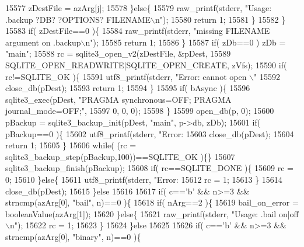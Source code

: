 \begin{DoxyCode}
{15577         zDestFile = azArg[j];
15578       \}\textcolor{keywordflow}{else}\{
15579         raw_printf(stderr, \textcolor{stringliteral}{"Usage: .backup ?DB? ?OPTIONS? FILENAME\(\backslash\)n"});
15580         \textcolor{keywordflow}{return} 1;
15581       \}
15582     \}
15583     \textcolor{keywordflow}{if}( zDestFile==0 )\{
15584       raw_printf(stderr, \textcolor{stringliteral}{"missing FILENAME argument on .backup\(\backslash\)n"});
15585       \textcolor{keywordflow}{return} 1;
15586     \}
15587     \textcolor{keywordflow}{if}( zDb==0 ) zDb = \textcolor{stringliteral}{"main"};
15588     rc = sqlite3_open_v2(zDestFile, &pDest, 
15589                   SQLITE_OPEN_READWRITE|SQLITE_OPEN_CREATE, zVfs);
15590     \textcolor{keywordflow}{if}( rc!=SQLITE_OK )\{
15591       utf8_printf(stderr, \textcolor{stringliteral}{"Error: cannot open \(\backslash\)"%
15592       close_db(pDest);
15593       \textcolor{keywordflow}{return} 1;
15594     \}
15595     \textcolor{keywordflow}{if}( bAsync )\{
15596       sqlite3_exec(pDest, \textcolor{stringliteral}{"PRAGMA synchronous=OFF; PRAGMA journal\_mode=OFF;"},
15597                    0, 0, 0);
15598     \}
15599     open_db(p, 0);
15600     pBackup = sqlite3_backup_init(pDest, \textcolor{stringliteral}{"main"}, p->db, zDb);
15601     \textcolor{keywordflow}{if}( pBackup==0 )\{
15602       utf8_printf(stderr, \textcolor{stringliteral}{"Error: %
15603       close_db(pDest);
15604       \textcolor{keywordflow}{return} 1;
15605     \}
15606     \textcolor{keywordflow}{while}(  (rc = sqlite3_backup_step(pBackup,100))==SQLITE_OK )\{\}
15607     sqlite3_backup_finish(pBackup);
15608     \textcolor{keywordflow}{if}( rc==SQLITE_DONE )\{
15609       rc = 0;
15610     \}\textcolor{keywordflow}{else}\{
15611       utf8_printf(stderr, \textcolor{stringliteral}{"Error: %
15612       rc = 1;
15613     \}
15614     close_db(pDest);
15615   \}\textcolor{keywordflow}{else}
15616 
15617   \textcolor{keywordflow}{if}( c==\textcolor{charliteral}{'b'} && n>=3 && strncmp(azArg[0], \textcolor{stringliteral}{"bail"}, n)==0 )\{
15618     \textcolor{keywordflow}{if}( nArg==2 )\{
15619       bail_on_error = booleanValue(azArg[1]);
15620     \}\textcolor{keywordflow}{else}\{
15621       raw_printf(stderr, \textcolor{stringliteral}{"Usage: .bail on|off\(\backslash\)n"});
15622       rc = 1;
15623     \}
15624   \}\textcolor{keywordflow}{else}
15625 
15626   \textcolor{keywordflow}{if}( c==\textcolor{charliteral}{'b'} && n>=3 && strncmp(azArg[0], \textcolor{stringliteral}{"binary"}, n)==0 )\{
}}}}
\end{DoxyCode}

